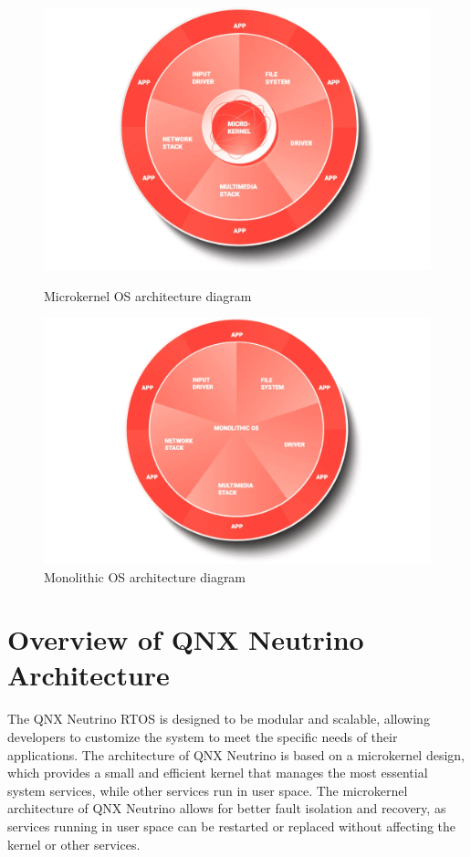 \documentclass{article}
\begin{document}
\begin{figure}[h!]
    \centering
    \begin{minipage}{0.45\textwidth}
        \centering
        \includegraphics[width=\textwidth]{graph1.png} %
        \caption{Microkernel OS architecture diagram \citep{WhatsRTOS2024}}
        \label{fig:microkernel}
    \end{minipage}
    \hfill
    \begin{minipage}{0.45\textwidth}
        \centering
        \includegraphics[width=\textwidth]{graph3.png} %
        \caption{Monolithic OS architecture diagram \citep{WhatsRTOS2024}}
        \label{fig:monolithic}
    \end{minipage}
\end{figure}

\section{Overview of QNX Neutrino Architecture}
\label{sec:qnx-neutrino-architecture}
The QNX Neutrino RTOS is designed to be modular and scalable, allowing developers to customize the system to meet the specific needs of their applications.
The architecture of QNX Neutrino is based on a microkernel design, which provides a small and efficient kernel that manages the most essential system services, while other services run in user space.
The microkernel architecture of QNX Neutrino allows for better fault isolation and recovery, as services running in user space can be restarted or replaced without affecting the kernel or other services.
\end{document}
